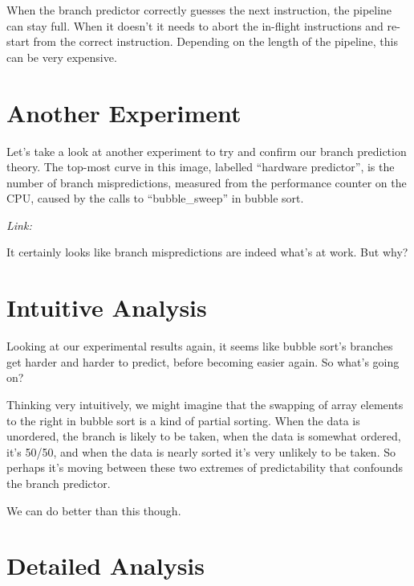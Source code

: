 \documentclass[11pt]{article}
\begin{document}
When the branch predictor correctly guesses the next instruction, the pipeline can stay full. When it doesn't it needs to abort the in-flight instructions and re-start from the correct instruction. Depending on the length of the pipeline, this can be very expensive.

\section{Another Experiment}

Let's take a look at another experiment to try and confirm our branch prediction theory.
The top-most curve in this image, labelled ``hardware predictor'', is the number of branch mispredictions, measured from the performance counter on the CPU, caused by the calls to ``bubble\_sweep'' in bubble sort.

\begin{center}\end{center}

\textit{Link: }\texttt{}

It certainly looks like branch mispredictions are indeed what's at work. But why?

\section{Intuitive Analysis}

Looking at our experimental results again, it seems like bubble sort's branches get harder and harder to predict, before becoming easier again. So what's going on?

Thinking very intuitively, we might imagine that the swapping of array elements to the right in bubble sort is a kind of partial sorting. When the data is unordered, the branch is likely to be taken, when the data is somewhat ordered, it's 50/50, and when the data is nearly sorted it's very unlikely to be taken. So perhaps it's moving between these two extremes of predictability that confounds the branch predictor.

We can do better than this though.

\section{Detailed Analysis}
\end{document}

